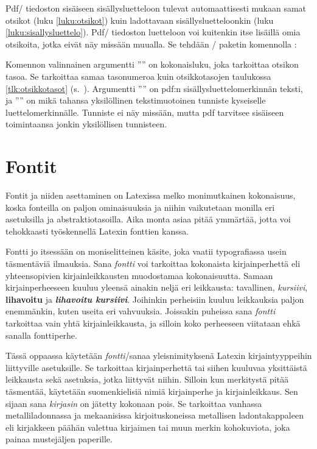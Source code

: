 Pdf\-/ tiedoston sisäiseen sisällysluetteloon tulevat automaattisesti
mukaan samat otsikot (luku \ref{luku:otsikot}) kuin ladottavaan
sisällysluetteloonkin (luku \ref{luku:sisallysluettelo}). Pdf\-/
tiedoston luetteloon voi kuitenkin itse lisäillä omia otsikoita, jotka
eivät näy missään muualla. Se tehdään \-/ paketin
komennolla :

\begin{koodilohkosis}
\end{koodilohkosis}

Komennon valinnainen argumentti '''' on kokonaisluku, joka
tarkoittaa otsikon tasoa. Se tarkoittaa samaa tasonumeroa kuin
otsikkotasojen taulukossa \ref{tlk:otsikkotasot}
(s.~\pageref{tlk:otsikkotasot}). Argumentti '''' on pdf:n
sisällysluettelomerkinnän teksti, ja '''' on mikä
tahansa yksilöllinen tekstimuotoinen tunniste kyseiselle
luettelomerkinnälle. Tunniste ei näy missään, mutta pdf tarvitsee
sisäiseen toimintaansa jonkin yksilöllisen tunnisteen.

\section{Fontit}
\label{luku:kirjaintyypit}

Fontit ja niiden asettaminen on Latexissa melko monimutkainen
kokonaisuus, koska fonteilla on paljon ominaisuuksia ja niihin
vaikutetaan monilla eri asetuksilla ja abstraktiotasoilla. Aika monta
asiaa pitää ymmärtää, jotta voi tehokkaasti työskennellä Latexin
fonttien kanssa.

Fontti jo itsessään on moniselitteinen käsite, joka vaatii typografiassa
usein täsmentäviä ilmauksia. Sana \emph{fontti} voi tarkoittaa
kokonaista kirjainperhettä eli yhteensopivien kirjainleikkausten
muodostamaa kokonaisuutta. Samaan kirjainperheeseen kuuluu yleensä
ainakin neljä eri leikkausta: tavallinen, \textit{kursiivi},
\textbf{lihavoitu} ja \textbf{\textit{lihavoitu kursiivi}}. Joihinkin
perheisiin kuuluu leikkauksia paljon enemmänkin, kuten useita eri
vahvuuksia. Joissakin puheissa sana \emph{fontti} tarkoittaa vain yhtä
kirjainleikkausta, ja silloin koko perheeseen viitataan ehkä sanalla
fonttiperhe.

Tässä oppaassa käytetään \emph{fontti}\-/sanaa yleisnimityksenä Latexin
kirjaintyyppeihin liittyville asetuksille. Se tarkoittaa kirjainperhettä
tai siihen kuuluvaa yksittäistä leikkausta sekä asetuksia, jotka
liittyvät niihin. Silloin kun merkitystä pitää täsmentää, käytetään
suomenkielisiä nimiä kirjainperhe ja kirjainleikkaus. Sen sijaan sana
\emph{kirjasin} on jätetty kokonaan pois. Se tarkoittaa vanhassa
metalliladonnassa ja mekaanisissa kirjoituskoneissa metallisen
ladontakappaleen eli kirjakkeen päähän valettua kirjaimen tai muun
merkin kohokuviota, joka painaa mustejäljen paperille.

